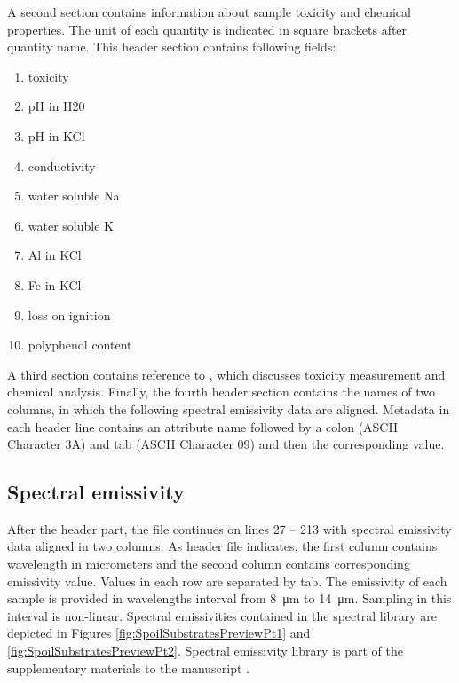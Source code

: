 \begin{appendices}
A second section contains information about sample toxicity and chemical properties. The unit of each quantity is indicated in square brackets after quantity name. This header section contains following fields:

\begin{enumerate}
	\item toxicity
	\item pH in H20
	\item pH in KCl
	\item conductivity
	\item water soluble Na
	\item water soluble K
	\item Al in KCl
	\item Fe in KCl
	\item loss on ignition
	\item polyphenol content
\end{enumerate}

A third section contains reference to \cite{FK05}, which discusses toxicity measurement and chemical analysis. Finally, the fourth header section contains the names of two columns, in which the following spectral emissivity data are aligned. Metadata in each header line contains an attribute name followed by a colon (ASCII Character 3A) and tab (ASCII Character 09) and then the corresponding value.

\subsection{Spectral emissivity}

After the header part, the file continues on lines 27 – 213 with spectral emissivity data aligned in two columns. As header file indicates, the first column contains wavelength in micrometers and the second column contains corresponding emissivity value. Values in each row are separated by tab. The emissivity of each sample is provided in wavelengths interval from \SI{8}{\micro\meter} to \SI{14}{\micro\meter}. Sampling in this interval is non-linear. Spectral emissivities contained in the spectral library are depicted in Figures \ref{fig:SpoilSubstratesPreviewPt1} and \ref{fig:SpoilSubstratesPreviewPt2}. Spectral emissivity library is part of the supplementary materials to the manuscript \cite{PP16}.


\end{appendices}
